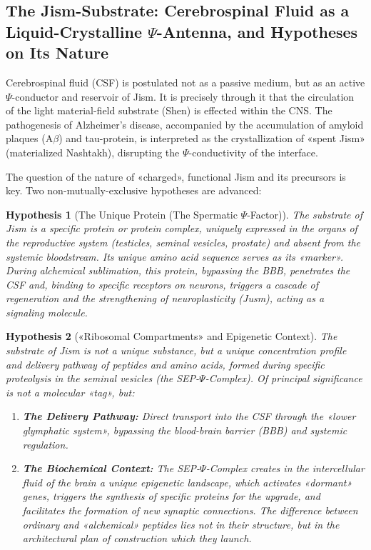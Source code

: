\documentclass[a4paper,12pt]{article}
\newtheorem{hypothesis}{Hypothesis}
\begin{document}
	\subsection{The Jism-Substrate: Cerebrospinal Fluid as a Liquid-Crystalline $\Psi$-Antenna, and Hypotheses on Its Nature}
	
	Cerebrospinal fluid (CSF) is postulated not as a passive medium, but as an active $\Psi$-conductor and reservoir of Jism. It is precisely through it that the circulation of the light material-field substrate (Shen) is effected within the CNS. The pathogenesis of Alzheimer's disease, accompanied by the accumulation of amyloid plaques (A$\beta$) and tau-protein, is interpreted as the crystallization of «spent Jism» (materialized Nashtakh), disrupting the $\Psi$-conductivity of the interface.
	
	The question of the nature of «charged», functional Jism and its precursors is key. Two non-mutually-exclusive hypotheses are advanced:
	
	\begin{hypothesis}[The Unique Protein (The Spermatic $\Psi$-Factor)]
		The substrate of Jism is a specific protein or protein complex, uniquely expressed in the organs of the reproductive system (testicles, seminal vesicles, prostate) and absent from the systemic bloodstream. Its unique amino acid sequence serves as its «marker». During alchemical sublimation, this protein, bypassing the BBB, penetrates the CSF and, binding to specific receptors on neurons, triggers a cascade of regeneration and the strengthening of neuroplasticity (Jusm), acting as a signaling molecule.
	\end{hypothesis}
	
	\begin{hypothesis}[«Ribosomal Compartments» and Epigenetic Context]
		The substrate of Jism is not a unique substance, but a unique concentration profile and delivery pathway of peptides and amino acids, formed during specific proteolysis in the seminal vesicles (the SEP-$\Psi$-Complex). Of principal significance is not a molecular «tag», but:
		
		\begin{enumerate}
			\item \textbf{The Delivery Pathway:} Direct transport into the CSF through the «lower glymphatic system», bypassing the blood-brain barrier (BBB) and systemic regulation.
			\item \textbf{The Biochemical Context:} The SEP-$\Psi$-Complex creates in the intercellular fluid of the brain a unique epigenetic landscape, which activates «dormant» genes, triggers the synthesis of specific proteins for the upgrade, and facilitates the formation of new synaptic connections. The difference between ordinary and «alchemical» peptides lies not in their structure, but in the architectural plan of construction which they launch.
		\end{enumerate}
	\end{hypothesis}
	
\end{document}
